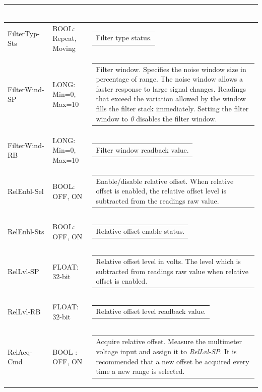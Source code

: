 \documentclass[openany]{article}
\begin{document}
\begin{longtable}{| m{3.0cm} m{4.5cm} m{7.0cm} |}
\begin{tabular}{@{}m{6cm}@{}}
						\end{tabular} \\ \hline
		FilterTyp-Sts & BOOL: Repeat, Moving & \begin{tabular}{@{}m{6cm}@{}}
	    					Filter type status.
						\end{tabular} \\ \hline
		FilterWind-SP & LONG: Min=0, Max=10 & \begin{tabular}{@{}m{6cm}@{}}
	    					Filter window. Specifies the noise window size in percentage of range. The noise window allows a faster response to large signal changes. Readings that exceed the variation allowed by the window fills the filter stack immediately. Setting the filter window to \emph{0} disables the filter window.
						\end{tabular} \\ \hline
		FilterWind-RB & LONG: Min=0, Max=10 & \begin{tabular}{@{}m{6cm}@{}}
	    					Filter window readback value.
						\end{tabular} \\ \hline
		RelEnbl-Sel & BOOL: OFF, ON & \begin{tabular}{@{}m{6cm}@{}}
	    					Enable/disable relative offset. When relative offset is enabled, the relative offset level is subtracted from the readings raw value.
						\end{tabular} \\ \hline
		RelEnbl-Sts & BOOL: OFF, ON & \begin{tabular}{@{}m{6cm}@{}}
	    					Relative offset enable status.
						\end{tabular} \\ \hline
		RelLvl-SP & FLOAT: 32-bit & \begin{tabular}{@{}m{6cm}@{}}
	    					Relative offset level in volts. The level which is subtracted from readings raw value when relative offset is enabled.
						\end{tabular} \\ \hline
		RelLvl-RB & FLOAT: 32-bit & \begin{tabular}{@{}m{6cm}@{}}
	    					Relative offset level readback value.
						\end{tabular} \\ \hline
		RelAcq-Cmd & BOOL : OFF, ON & \begin{tabular}{@{}m{6cm}@{}}
						Acquire relative offset. Measure the multimeter voltage input and assign it to \emph{RelLvl-SP}. It is recommended that a new offset be acquired every time a new range is selected.

\end{tabular}
\end{longtable}
\end{document}
